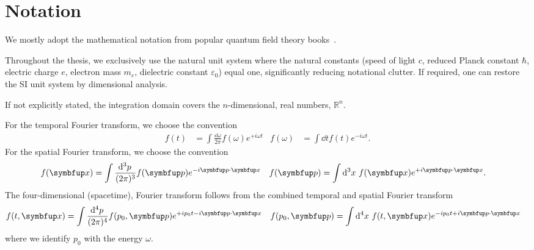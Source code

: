 \section*{Notation}

We mostly adopt the mathematical notation from popular quantum field theory books~\cite{Weinberg1995,Peskin1995}.

Throughout the thesis, we exclusively use the natural unit system where the natural constants (speed of light $c$, reduced Planck constant $\hbar$, electric charge $e$, electron mass $m_e$, dielectric constant $\varepsilon_0$) equal one, significantly reducing notational clutter.
If required, one can restore the SI unit system by dimensional analysis.

If not explicitly stated, the integration domain covers the $n$-dimensional, real numbers, $\mathbb{R}^n$.

For the temporal Fourier transform, we choose the convention
\begin{align*}
	f(t)
	&=
	\int\frac{\dd{\omega}}{2\pi}
	f(\omega)
	e^{+i\omega t}
	&
	f(\omega)
	&=
	\int\dd{t}
	f(t)
	e^{-i\omega t}
	.
\end{align*}
For the spatial Fourier transform, we choose the convention
\begin{align*}
	f(\vb{x})
	&=
	\int\frac{\dd[3]{p}}{(2\pi)^3}
	f(\vb{p})
	e^{-i\vb{p}\vdot\vb{x}}
	&
	f(\vb{p})
	&=
	\int\dd[3]{x}
	f(\vb{x})
	e^{+i\vb{p}\vdot\vb{x}}
	.
\end{align*}
The four-dimensional (spacetime), Fourier transform follows from the combined temporal and spatial Fourier transform
\begin{align*}
	f(t,\vb{x})
	&=
	\int\frac{\dd[4]{p}}{(2\pi)^4}
	f(p_0,\vb{p})
	e^{+ip_0 t-i\vb{p}\vdot\vb{x}}
	&
	f(p_0,\vb{p})
	&=
	\int\dd[4]{x}
	f(t,\vb{x})
	e^{-ip_0 t+i\vb{p}\vdot\vb{x}}
\end{align*}
where we identify $p_0$ with the energy $\omega$.


